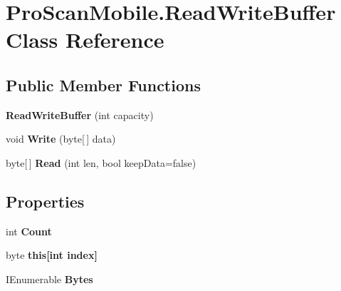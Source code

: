\hypertarget{class_pro_scan_mobile_1_1_read_write_buffer}{\section{Pro\-Scan\-Mobile.\-Read\-Write\-Buffer Class Reference}
\label{class_pro_scan_mobile_1_1_read_write_buffer}
}
\subsection*{Public Member Functions}
\begin{DoxyCompactItemize}
\item 
\hypertarget{class_pro_scan_mobile_1_1_read_write_buffer_ae2f67e53253dd85cce783a53c0a08dc4}{{\bfseries Read\-Write\-Buffer} (int capacity)}\label{class_pro_scan_mobile_1_1_read_write_buffer_ae2f67e53253dd85cce783a53c0a08dc4}

\item 
\hypertarget{class_pro_scan_mobile_1_1_read_write_buffer_a8103075b1e58a61acbaa5392bd0d5e5f}{void {\bfseries Write} (byte\mbox{[}$\,$\mbox{]} data)}\label{class_pro_scan_mobile_1_1_read_write_buffer_a8103075b1e58a61acbaa5392bd0d5e5f}

\item 
\hypertarget{class_pro_scan_mobile_1_1_read_write_buffer_a1220f96aede4304e1815b03e55855f77}{byte\mbox{[}$\,$\mbox{]} {\bfseries Read} (int len, bool keep\-Data=false)}\label{class_pro_scan_mobile_1_1_read_write_buffer_a1220f96aede4304e1815b03e55855f77}

\end{DoxyCompactItemize}
\subsection*{Properties}
\begin{DoxyCompactItemize}
\item 
\hypertarget{class_pro_scan_mobile_1_1_read_write_buffer_a965102f5fcdaeb58b91f495a98a4cac1}{int {\bfseries Count}}\label{class_pro_scan_mobile_1_1_read_write_buffer_a965102f5fcdaeb58b91f495a98a4cac1}

\item 
\hypertarget{class_pro_scan_mobile_1_1_read_write_buffer_a9d6ab0f4c9bdbf0c43e7257ca598795d}{byte {\bfseries this\mbox{[}int index\mbox{]}}}\label{class_pro_scan_mobile_1_1_read_write_buffer_a9d6ab0f4c9bdbf0c43e7257ca598795d}

\item 
\hypertarget{class_pro_scan_mobile_1_1_read_write_buffer_a615a176a8c5115ee8add73f7116b0a30}{I\-Enumerable {\bfseries Bytes}}\label{class_pro_scan_mobile_1_1_read_write_buffer_a615a176a8c5115ee8add73f7116b0a30}

\end{DoxyCompactItemize}


